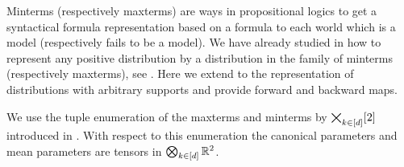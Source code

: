 

Minterms (respectively maxterms) are ways in propositional logics to get a syntactical formula representation based on a formula to each world which is a model (respectively fails to be a model).
We have already studied in  how to represent any positive distribution by a distribution in the family of minterms (respectively maxterms), see .
Here we extend to the representation of distributions with arbitrary supports and provide forward and backward maps.

We use the tuple enumeration of the maxterms and minterms by $\bigtimes_{k\in[d]}[2]$ introduced in .
With respect to this enumeration the canonical parameters and mean parameters are tensors in $\bigotimes_{k\in[d]}\mathbb{R}^2$.

